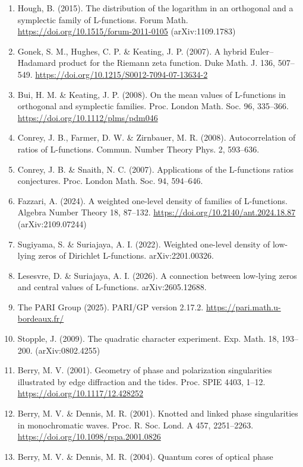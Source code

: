 \documentclass[
  10pt,
]{article}
\begin{document}
\begin{enumerate}
  experiments concerning the moments of \(L(1/2, \chi_d)\). Exp. Math.
  21, 307--328. (arXiv:1110.0253)
\item
  Hough, B. (2015). The distribution of the logarithm in an orthogonal
  and a symplectic family of L-functions. Forum Math.
  \url{https://doi.org/10.1515/forum-2011-0105} (arXiv:1109.1783)
\item
  Gonek, S. M., Hughes, C. P. \& Keating, J. P. (2007). A hybrid
  Euler--Hadamard product for the Riemann zeta function. Duke Math. J.
  136, 507--549. \url{https://doi.org/10.1215/S0012-7094-07-13634-2}
\item
  Bui, H. M. \& Keating, J. P. (2008). On the mean values of L-functions
  in orthogonal and symplectic families. Proc. London Math. Soc. 96,
  335--366. \url{https://doi.org/10.1112/plms/pdm046}
\item
  Conrey, J. B., Farmer, D. W. \& Zirnbauer, M. R. (2008).
  Autocorrelation of ratios of L-functions. Commun. Number Theory Phys.
  2, 593--636.
\item
  Conrey, J. B. \& Snaith, N. C. (2007). Applications of the L-functions
  ratios conjectures. Proc. London Math. Soc. 94, 594--646.
\item
  Fazzari, A. (2024). A weighted one-level density of families of
  L-functions. Algebra Number Theory 18, 87--132.
  \url{https://doi.org/10.2140/ant.2024.18.87} (arXiv:2109.07244)
\item
  Sugiyama, S. \& Suriajaya, A. I. (2022). Weighted one-level density of
  low-lying zeros of Dirichlet L-functions. arXiv:2201.00326.
\item
  Lesesvre, D. \& Suriajaya, A. I. (2026). A connection between
  low-lying zeros and central values of L-functions. arXiv:2605.12688.
\item
  The PARI Group (2025). PARI/GP version 2.17.2.
  \url{https://pari.math.u-bordeaux.fr/}
\item
  Stopple, J. (2009). The quadratic character experiment. Exp. Math. 18,
  193--200. (arXiv:0802.4255)
\item
  Berry, M. V. (2001). Geometry of phase and polarization singularities
  illustrated by edge diffraction and the tides. Proc. SPIE 4403, 1--12.
  \url{https://doi.org/10.1117/12.428252}
\item
  Berry, M. V. \& Dennis, M. R. (2001). Knotted and linked phase
  singularities in monochromatic waves. Proc. R. Soc. Lond. A 457,
  2251--2263. \url{https://doi.org/10.1098/rspa.2001.0826}
\item
  Berry, M. V. \& Dennis, M. R. (2004). Quantum cores of optical phase

\end{enumerate}
\end{document}

